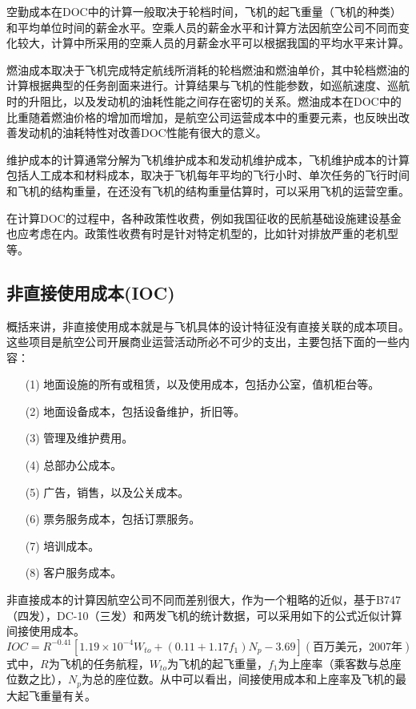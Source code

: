 空勤成本在DOC中的计算一般取决于轮档时间，飞机的起飞重量（飞机的种类）和平均单位时间的薪金水平。空乘人员的薪金水平和计算方法因航空公司不同而变化较大，计算中所采用的空乘人员的月薪金水平可以根据我国的平均水平来计算。

燃油成本取决于飞机完成特定航线所消耗的轮档燃油和燃油单价，其中轮档燃油的计算根据典型的任务剖面来进行。计算结果与飞机的性能参数，如巡航速度、巡航时的升阻比，以及发动机的油耗性能之间存在密切的关系。燃油成本在DOC中的比重随着燃油价格的增加而增加，是航空公司运营成本中的重要元素，也反映出改善发动机的油耗特性对改善DOC性能有很大的意义。

维护成本的计算通常分解为飞机维护成本和发动机维护成本，飞机维护成本的计算包括人工成本和材料成本，取决于飞机每年平均的飞行小时、单次任务的飞行时间和飞机的结构重量，在还没有飞机的结构重量估算时，可以采用飞机的运营空重。

在计算DOC的过程中，各种政策性收费，例如我国征收的民航基础设施建设基金也应考虑在内。政策性收费有时是针对特定机型的，比如针对排放严重的老机型等。

\subsection{非直接使用成本(IOC)}
概括来讲，非直接使用成本就是与飞机具体的设计特征没有直接关联的成本项目。这些项目是航空公司开展商业运营活动所必不可少的支出，主要包括下面的一些内容：
\begin{itemize}
\item[(1)]地面设施的所有或租赁，以及使用成本，包括办公室，值机柜台等。
\item[(2)]地面设备成本，包括设备维护，折旧等。
\item[(3)]管理及维护费用。
\item[(4)]总部办公成本。
\item[(5)]广告，销售，以及公关成本。
\item[(6)]票务服务成本，包括订票服务。
\item[(7)]培训成本。
\item[(8)]客户服务成本。
\end{itemize}
非直接成本的计算因航空公司不同而差别很大，作为一个粗略的近似，基于B747%
（四发），DC-10（三发）和两发飞机的统计数据，可以采用如下的公式近似计算%
间接使用成本。
\begin{equation}
IOC=R^{-0.41}[1.19\times{10^{-4}W_{to}}+(0.11+1.17f_1)N_p-3.69](\mbox{百万美元}，2007\mbox{年})
\end{equation}
式中，$R$为飞机的任务航程，$W_{to}$为飞机的起飞重量，$f_1$为上座率（乘客数与总座位数之比），$N_p$为总的座位数。从中可以看出，间接使用成本和上座率及飞机的最大起飞重量有关。

